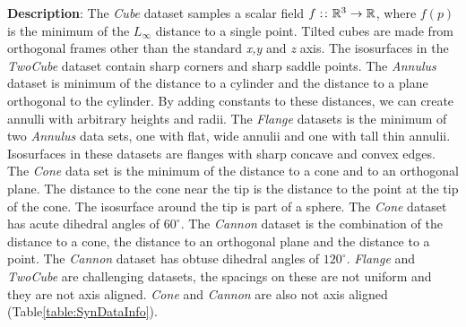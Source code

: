 \textbf{Description}:
The \emph{Cube} dataset samples a scalar field $f:\colon\mathbb{R}^{3} \to \mathbb{R}$, where $f(p)$ is the minimum of the $L_{\infty}$ distance to a single point. Tilted cubes are made from orthogonal frames other than the standard \emph{x,y} and \emph{z} axis. 
The isosurfaces in the \emph{TwoCube} dataset contain sharp corners
and sharp saddle points.
The \emph{Annulus} dataset is minimum of the distance to a cylinder and the distance to a plane orthogonal to the cylinder.
By adding constants to these distances, we can create annulli with arbitrary heights and radii.
The \emph{Flange} datasets is the minimum of two \emph{Annulus} data sets,
one with flat, wide annulii and one with tall thin annulii.
Isosurfaces in these datasets are flanges with sharp concave and convex edges.
The \emph{Cone} data set is the minimum of the distance to a cone and to an orthogonal plane.
The distance to the cone near the tip is the distance to the point at the tip of the cone.
The isosurface around the tip is part of a sphere.
The \emph{Cone} dataset has acute dihedral angles of $60^\circ$.
The \emph{Cannon} dataset is the combination of the distance to a cone, the distance to an orthogonal plane
and the distance to a point.
The \emph{Cannon} dataset has obtuse dihedral angles of $120^\circ$.
\emph{Flange} and \emph{TwoCube} are challenging datasets, the spacings on these are not uniform and they are not axis aligned.
\emph{Cone} and \emph{Cannon} are also not axis aligned (Table\ref{table:SynDataInfo}).


